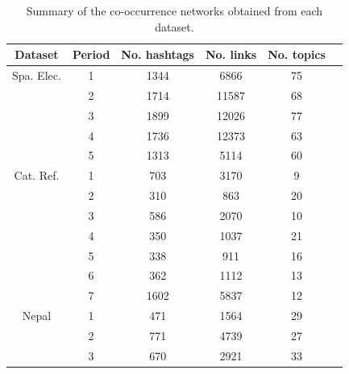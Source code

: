 \begin{table}
    \centering
\caption[Summary of the co-occurrence networks obtained from each dataset]{\label{tab:nets} Summary of the co-occurrence networks obtained from each dataset.}
\footnotesize
\begin{tabular}{c c c c c c }
\hline
Dataset & Period & No. hashtags & No. links & No. topics\\
\hline \hline
Spa. Elec. & 1 & 1344 & 6866 & 75 \\
& 2 & 1714 & 11587 & 68 \\
& 3 & 1899 & 12026 & 77\\
& 4 & 1736 & 12373 & 63\\
& 5 & 1313 & 5114 & 60\\

\hline

Cat. Ref. & 1 & 703 & 3170 & 9 \\
& 2 & 310 & 863 & 20 \\
& 3 & 586 & 2070 & 10\\
& 4 & 350 & 1037 & 21\\
& 5 & 338 & 911 & 16\\
& 6 & 362 & 1112 & 13\\
& 7 & 1602 & 5837 & 12\\

\hline
Nepal & 1 & 471 & 1564 & 29 \\
& 2 & 771 & 4739 & 27 \\
& 3 & 670 & 2921 & 33\\

\hline

\end{tabular}\\
\end{table}



